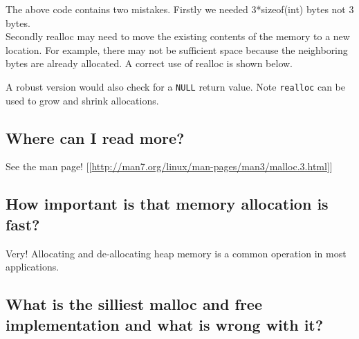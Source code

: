 The above code contains two mistakes. Firstly we needed 3*sizeof(int)
bytes not 3 bytes.\\Secondly realloc may need to move the existing
contents of the memory to a new location. For example, there may not be
sufficient space because the neighboring bytes are already allocated. A
correct use of realloc is shown below.

\begin{Shaded}
\begin{Highlighting}[]
 \NormalTok{* }\NormalTok{(}\NormalTok{));}
\end{Highlighting}
\end{Shaded}

A robust version would also check for a \texttt{NULL} return value. Note
\texttt{realloc} can be used to grow and shrink allocations.

\subsection{Where can I read more?}\label{where-can-i-read-more}

See the man page!
{[}{[}\url{http://man7.org/linux/man-pages/man3/malloc.3.html}{]}{]}

\subsection{How important is that memory allocation is
fast?}\label{how-important-is-that-memory-allocation-is-fast}

Very! Allocating and de-allocating heap memory is a common operation in
most applications.

\subsection{What is the silliest malloc and free implementation and what
is wrong with
it?}\label{what-is-the-silliest-malloc-and-free-implementation-and-what-is-wrong-with-it}

\begin{Shaded}
\begin{Highlighting}[]
    
    \NormalTok{*) -}\NormalTok{) } 
    
\NormalTok{\}}
 \NormalTok{\}}
\end{Highlighting}
\end{Shaded}

